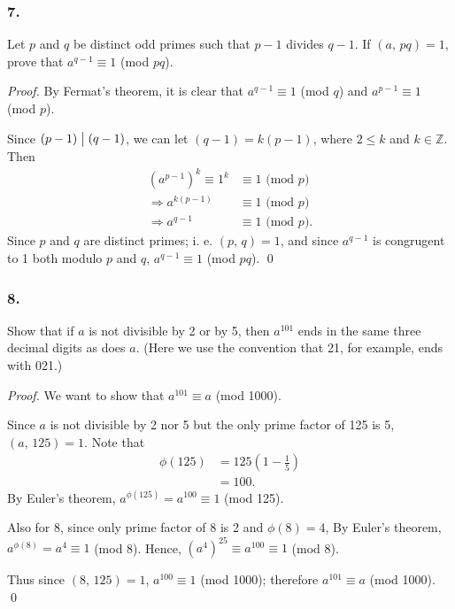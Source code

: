 \subsubsection{7.} Let $p$ and $q$ be distinct odd primes such that
$p-1$ divides $q-1$. If $\left(a,\,pq\right)=1$, prove that $a^{q-1}\equiv 1$ (mod $pq$).

\begin{proof}
    By Fermat's theorem, it is clear that $a^{q-1} \equiv 1$ (mod $q$) and
    $a^{p-1} \equiv 1$ (mod $p$).

    Since $\left(p-1\right)\bigm| \left(q-1\right)$, we can let $\left(q-1\right)=k\left(p-1\right)$,
    where $2 \leq k$ and $k \in \mathbb{Z}$. Then
    \begin{align*}
        \left(a^{p-1}\right)^k \equiv 1^k &\equiv 1 \mbox{ (mod $p$)} \\
        \Rightarrow a^{k\left(p-1\right)} &\equiv 1 \mbox{ (mod $p$)} \\
        \Rightarrow a^{q-1} &\equiv 1 \mbox{ (mod $p$)}.
    \end{align*}
    Since $p$ and $q$ are distinct primes; i. e. $\left(p,\,q\right)=1$, and since
    $a^{q-1}$ is congrugent to 1 both modulo $p$ and $q$, $a^{q-1}\equiv 1$ (mod $pq$).
    \qed
\end{proof}

\subsubsection{8.} Show that if $a$ is not divisible by 2 or by 5, then $a^{101}$
ends in the same three decimal digits as does $a$. (Here we use the convention that
21, for example, ends with 021.)

\begin{proof}
    We want to show that $a^{101} \equiv a$ (mod 1000).
    
    Since $a$ is not divisible by 2 nor 5 but the only prime factor of 125 is 5,
    $\left(a,\,125\right)=1$. Note that
    \begin{align*}
        \phi\left(125\right) &= 125 \left(1-\frac{1}{5}\right) \\
        &= 100.
    \end{align*}
    By Euler's theorem, $a^{\phi\left(125\right)} = a^{100} \equiv 1$ (mod 125).

    Also for 8, since only prime factor of 8 is 2 and $\phi\left(8\right) = 4$,
    By Euler's theorem, $a^{\phi\left(8\right)} = a^{4} \equiv 1$ (mod 8). Hence,
    $\left(a^{4}\right)^{25} \equiv a^{100} \equiv 1$ (mod 8).

    Thus since $\left(8,\,125\right)=1$, $a^{100} \equiv 1$ (mod 1000); therefore $a^{101} \equiv a$ (mod 1000).
    \qed
\end{proof}

